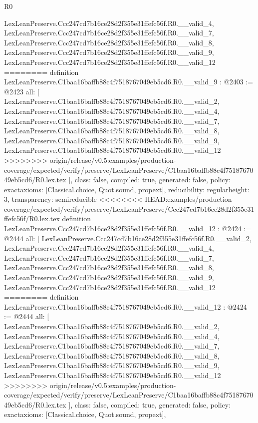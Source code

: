 \begin{lexlean}{R0}
\begin{coremodule}
{{{{{{{{{{{{{{{{{{{{{{{{{{{{{{{{{{{{{{{{{{{{{{{{    LexLeanPreserve.Ccc247cd7b16ce28d2f355e31ffefc56f.R0.__valid_4,
    LexLeanPreserve.Ccc247cd7b16ce28d2f355e31ffefc56f.R0.__valid_7,
    LexLeanPreserve.Ccc247cd7b16ce28d2f355e31ffefc56f.R0.__valid_8,
    LexLeanPreserve.Ccc247cd7b16ce28d2f355e31ffefc56f.R0.__valid_9,
    LexLeanPreserve.Ccc247cd7b16ce28d2f355e31ffefc56f.R0.__valid_12
========
definition LexLeanPreserve.C1baa16baffb88c4f7518767049eb5cd6.R0.__valid_9 : @2403 := @2423 {
  all: [
    LexLeanPreserve.C1baa16baffb88c4f7518767049eb5cd6.R0.__valid_2,
    LexLeanPreserve.C1baa16baffb88c4f7518767049eb5cd6.R0.__valid_4,
    LexLeanPreserve.C1baa16baffb88c4f7518767049eb5cd6.R0.__valid_7,
    LexLeanPreserve.C1baa16baffb88c4f7518767049eb5cd6.R0.__valid_8,
    LexLeanPreserve.C1baa16baffb88c4f7518767049eb5cd6.R0.__valid_9,
    LexLeanPreserve.C1baa16baffb88c4f7518767049eb5cd6.R0.__valid_12
>>>>>>>> origin/release/v0.5:examples/production-coverage/expected/verify/preserve/LexLeanPreserve/C1baa16baffb88c4f7518767049eb5cd6/R0.lex.tex
  ],
  class: false,
  compiled: true,
  generated: false,
  policy: exact{axioms: [Classical.choice, Quot.sound, propext]},
  reducibility: regular{height: 3},
  transparency: semireducible
}
<<<<<<<< HEAD:examples/production-coverage/expected/verify/preserve/LexLeanPreserve/Ccc247cd7b16ce28d2f355e31ffefc56f/R0.lex.tex
definition LexLeanPreserve.Ccc247cd7b16ce28d2f355e31ffefc56f.R0.__valid_12 : @2424 := @2444 {
  all: [
    LexLeanPreserve.Ccc247cd7b16ce28d2f355e31ffefc56f.R0.__valid_2,
    LexLeanPreserve.Ccc247cd7b16ce28d2f355e31ffefc56f.R0.__valid_4,
    LexLeanPreserve.Ccc247cd7b16ce28d2f355e31ffefc56f.R0.__valid_7,
    LexLeanPreserve.Ccc247cd7b16ce28d2f355e31ffefc56f.R0.__valid_8,
    LexLeanPreserve.Ccc247cd7b16ce28d2f355e31ffefc56f.R0.__valid_9,
    LexLeanPreserve.Ccc247cd7b16ce28d2f355e31ffefc56f.R0.__valid_12
========
definition LexLeanPreserve.C1baa16baffb88c4f7518767049eb5cd6.R0.__valid_12 : @2424 := @2444 {
  all: [
    LexLeanPreserve.C1baa16baffb88c4f7518767049eb5cd6.R0.__valid_2,
    LexLeanPreserve.C1baa16baffb88c4f7518767049eb5cd6.R0.__valid_4,
    LexLeanPreserve.C1baa16baffb88c4f7518767049eb5cd6.R0.__valid_7,
    LexLeanPreserve.C1baa16baffb88c4f7518767049eb5cd6.R0.__valid_8,
    LexLeanPreserve.C1baa16baffb88c4f7518767049eb5cd6.R0.__valid_9,
    LexLeanPreserve.C1baa16baffb88c4f7518767049eb5cd6.R0.__valid_12
>>>>>>>> origin/release/v0.5:examples/production-coverage/expected/verify/preserve/LexLeanPreserve/C1baa16baffb88c4f7518767049eb5cd6/R0.lex.tex
  ],
  class: false,
  compiled: true,
  generated: false,
  policy: exact{axioms: [Classical.choice, Quot.sound, propext]},
}}}}}}}}}}}}}}}}}}}}}}}}}}}}}}}}}}}}}}}}}}}}}}}}}}
\end{coremodule}
\end{lexlean}
